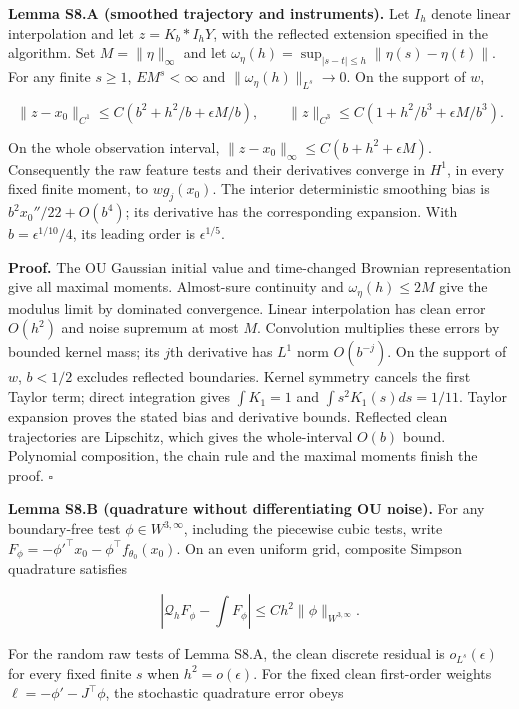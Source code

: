 \documentclass[
  american,
  11pt,
]{article}
\begin{document}
\textbf{Lemma S8.A (smoothed trajectory and instruments).} Let \(I_h\)
denote linear interpolation and let \(z=K_b*I_hY\), with the reflected
extension specified in the algorithm. Set \(M=\|\eta\|_\infty\) and let
\(\omega_\eta(h)=\sup_{|s-t|\leq h}\|\eta(s)-\eta(t)\|\). For any finite
\(s\geq1\), \(E M^s<\infty\) and \(\|\omega_\eta(h)\|_{L^s}\to0\). On
the support of \(w\),

\[
\|z-x_0\|_{C^1}\leq C(b^2+h^2/b+\epsilon M/b),\qquad
\|z\|_{C^3}\leq C(1+h^2/b^3+\epsilon M/b^3).
\]

On the whole observation interval,
\(\|z-x_0\|_\infty\leq C(b+h^2+\epsilon M)\). Consequently the raw
feature tests and their derivatives converge in \(H^1\), in every fixed
finite moment, to \(w g_j(x_0)\). The interior deterministic smoothing
bias is \(b^2x_0''/22+O(b^4)\); its derivative has the corresponding
expansion. With \(b=\epsilon^{1/10}/4\), its leading order is
\(\epsilon^{1/5}\).

\textbf{Proof.} The OU Gaussian initial value and time-changed Brownian
representation give all maximal moments. Almost-sure continuity and
\(\omega_\eta(h)\leq2M\) give the modulus limit by dominated
convergence. Linear interpolation has clean error \(O(h^2)\) and noise
supremum at most \(M\). Convolution multiplies these errors by bounded
kernel mass; its \(j\)th derivative has \(L^1\) norm \(O(b^{-j})\). On
the support of \(w\), \(b<1/2\) excludes reflected boundaries. Kernel
symmetry cancels the first Taylor term; direct integration gives
\(\int K_1=1\) and \(\int s^2K_1(s)ds=1/11\). Taylor expansion proves
the stated bias and derivative bounds. Reflected clean trajectories are
Lipschitz, which gives the whole-interval \(O(b)\) bound. Polynomial
composition, the chain rule and the maximal moments finish the proof.
\(\square\)

\textbf{Lemma S8.B (quadrature without differentiating OU noise).} For
any boundary-free test \(\phi\in W^{3,\infty}\), including the piecewise
cubic tests, write
\(F_\phi=-\phi'^\top x_0-\phi^\top f_{\theta_0}(x_0)\). On an even
uniform grid, composite Simpson quadrature satisfies

\[
|\mathcal Q_hF_\phi-\textstyle\int F_\phi|
\leq C h^2\|\phi\|_{W^{3,\infty}}.
\]

For the random raw tests of Lemma S8.A, the clean discrete residual is
\(o_{L^s}(\epsilon)\) for every fixed finite \(s\) when
\(h^2=o(\epsilon)\). For the fixed clean first-order weights
\(\ell=-\phi'-J^\top\phi\), the stochastic quadrature error obeys
\end{document}
